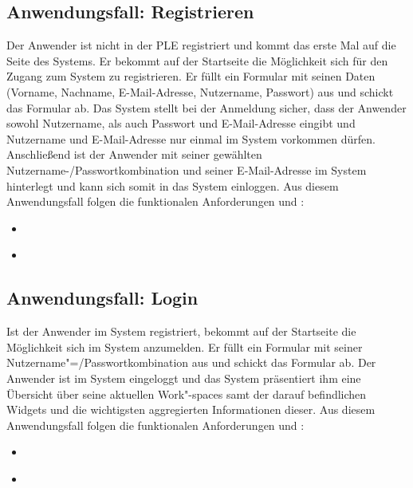 \subsection{Anwendungsfall: Registrieren}
Der Anwender ist nicht in der \ac{PLE} registriert und kommt das erste Mal auf die Seite des Systems. Er bekommt auf der Startseite die Möglichkeit sich für den Zugang zum System zu registrieren. Er füllt ein Formular mit seinen Daten (Vorname, Nachname, E-Mail-Adresse, Nutzername, Passwort) aus und schickt das Formular ab. Das System stellt bei der Anmeldung sicher, dass der Anwender sowohl Nutzername, als auch Passwort und E-Mail-Adresse eingibt und Nutzername und E-Mail-Adresse nur einmal im System vorkommen dürfen. Anschließend ist der Anwender mit seiner gewählten Nutzername-/Passwortkombination und seiner E-Mail-Adresse im System hinterlegt und kann sich somit in das System einloggen. Aus diesem Anwendungsfall folgen die funktionalen Anforderungen  und :\\
\begin{itemize}
 \item \requirementf{\requirementRegistrieren}\label{requirementRegistrieren}
 \item \requirementf{\requirementUniqueLoginEmail}\label{requirementUniqueLoginEmail}
\end{itemize}
 
\subsection{Anwendungsfall: Login}
Ist der Anwender im System registriert, bekommt auf der Startseite die Möglichkeit sich im System anzumelden. Er füllt ein Formular mit seiner Nutzername"=/Passwortkombination aus und schickt das Formular ab. Der Anwender ist im System eingeloggt und das System präsentiert ihm eine Übersicht über seine aktuellen Work"-spaces samt der darauf befindlichen Widgets und die wichtigsten aggregierten Informationen dieser. Aus diesem Anwendungsfall folgen die funktionalen Anforderungen  und :
\begin{itemize}
 \item \requirementf{\requirementLogin}\label{requirementLogin}
 \item \requirementf{\requirementZugriffAufEigeneWidgets}\label{requirementZugriffAufEigeneWidgets}
\end{itemize}

